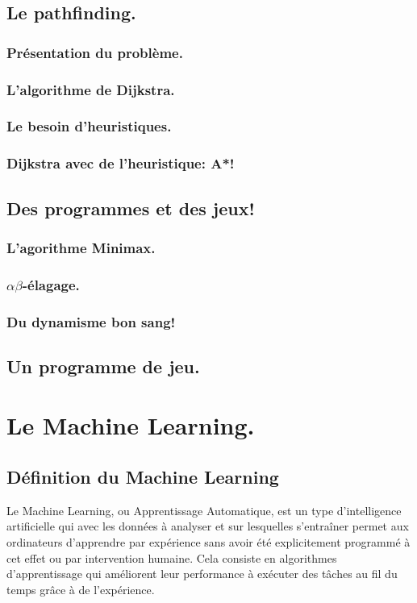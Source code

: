 \documentclass[a4paper, 12pt]{article}
\numberwithin{equation}{subsection}
\begin{document}
\subsection{Le pathfinding.}
\subsubsection{Présentation du problème.}
\subsubsection{L'algorithme de Dijkstra.}
\subsubsection{Le besoin d'heuristiques.}
\subsubsection{Dijkstra avec de l'heuristique: A*!}

\subsection{Des programmes et des jeux!}
\subsubsection{L'agorithme Minimax.}
\subsubsection{$\alpha\beta$-élagage.}
\subsubsection{Du dynamisme bon sang!}
\subsection{Un programme de jeu.}
\newpage
\section{Le Machine Learning.}
\subsection{Définition du Machine Learning}
Le Machine Learning, ou Apprentissage Automatique, est un type d'intelligence artificielle qui avec les données à analyser et sur lesquelles s'entraîner permet aux ordinateurs d’apprendre par expérience sans avoir été explicitement programmé à cet effet ou par intervention humaine. Cela consiste en algorithmes d’apprentissage qui améliorent leur performance à exécuter des tâches au fil du temps grâce à de l’expérience.\\[1.0cm]
\end{document}
